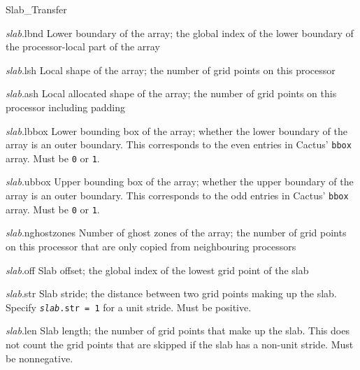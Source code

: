 \begin{FunctionDescription}{Slab\_Transfer}{}
\begin{ParameterSection}
\begin{Parameter}{\textit{slab}.lbnd}
Lower boundary of the array; the global index of the lower boundary of
the processor-local part of the array
\end{Parameter}

\begin{Parameter}{\textit{slab}.lsh}
Local shape of the array; the number of grid points on this processor
\end{Parameter}

\begin{Parameter}{\textit{slab}.ash}
Local allocated shape of the array; the number of grid points on this
processor including padding
\end{Parameter}

\begin{Parameter}{\textit{slab}.lbbox}
Lower bounding box of the array; whether the lower boundary of the
array is an outer boundary.  This corresponds to the even entries in
Cactus' \texttt{bbox} array.  Must be \texttt{0} or \texttt{1}.
\end{Parameter}

\begin{Parameter}{\textit{slab}.ubbox}
Upper bounding box of the array; whether the upper boundary of the
array is an outer boundary.  This corresponds to the odd entries in
Cactus' \texttt{bbox} array.  Must be \texttt{0} or \texttt{1}.
\end{Parameter}

\begin{Parameter}{\textit{slab}.nghostzones}
Number of ghost zones of the array; the number of grid points on this
processor that are only copied from neighbouring processors
\end{Parameter}

\begin{Parameter}{\textit{slab}.off}
Slab offset; the global index of the lowest grid point of the slab
\end{Parameter}

\begin{Parameter}{\textit{slab}.str}
Slab stride; the distance between two grid points making up the slab.
Specify \texttt{\textit{slab}.str = 1} for a unit stride.  Must be
positive.
\end{Parameter}

\begin{Parameter}{\textit{slab}.len}
Slab length; the number of grid points that make up the slab.  This
does not count the grid points that are skipped if the slab has a
non-unit stride.  Must be nonnegative.
\end{Parameter}


\end{ParameterSection}
\end{FunctionDescription}
